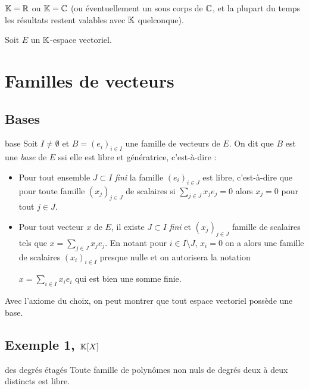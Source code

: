$\mathbb{K} = \mathbb{R}$ ou $\mathbb{K} = \mathbb{C}$ (ou éventuellement un sous corps de $\mathbb{C}$, et la plupart du temps 
les résultats restent valables avec $\mathbb{K}$ quelconque). 

Soit $E$ un $\mathbb{K}$-espace vectoriel. 

\section{Familles de vecteurs}
\subsection{Bases }

\begin{definition}{base}{}
    Soit $I \neq \emptyset$ et $B = (e_i)_{i \in I}$ une famille de vecteurs de $E$. 
    On dit que $B$ est une \emph{base} de $E$ ssi elle est libre et génératrice, c'est-à-dire : 
    \begin{itemize}
        \item Pour tout ensemble $J \subset I$ \emph{fini} la famille $(e_i)_{i \in J}$ est libre, c'est-à-dire que
            pour toute famille $(x_j)_{j \in J} $ de scalaires si $\sum_{j \in J} x_j e_j = 0$ alors $x_j = 0$ pour tout $j \in J$.
        \item Pour tout vecteur $x$ de $E$, il existe $J \subset I$ \emph{fini} et $(x_j)_{j \in J}$ famille 
        de scalaires tels que $x = \displaystyle \sum_{j \in J} x_j e_j$.
        En notant pour $i \in I \setminus J$, $x_i = 0$ on a alors une famille de scalaires 
        $(x_i)_{i \in I}$ presque nulle et on autorisera la notation 
        
        $x = \sum_{i \in I} x_i e_i$ qui 
        est bien une somme finie.
    \end{itemize}
\end{definition}

\begin{remarque}
    Avec l'axiome du choix, on peut montrer que tout espace vectoriel possède une base.
\end{remarque}

\subsection{Exemple 1, \texorpdfstring{$\mathbb{K}[X]$}{K[X]}}

\begin{theoreme}{des degrés étagés}{}
    Toute famille de polynômes non nuls de degrés deux à deux distincts est libre.
\end{theoreme}

